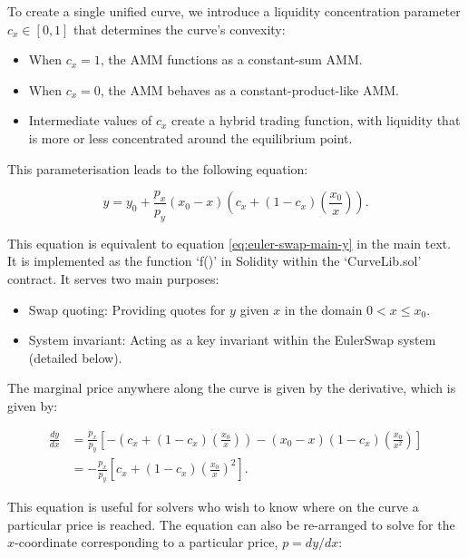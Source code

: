 \documentclass{article}
\begin{document}
To create a single unified curve, we introduce a liquidity concentration parameter \( c_x \in [0, 1] \) that determines the curve's convexity:

\begin{itemize}
    \item When \( c_x = 1 \), the AMM functions as a constant-sum AMM.
    \item When \( c_x = 0 \), the AMM behaves as a constant-product-like AMM.
    \item Intermediate values of \( c_x \) create a hybrid trading function, with liquidity that is more or less concentrated around the equilibrium point.
\end{itemize}

This parameterisation leads to the following equation:

\begin{equation}
    \label{eq:EulerSwap-1}
    y = y_0 + \frac{p_x}{p_y} (x_0 - x) \left( c_x + (1 - c_x) \left(\frac{x_0}{x}\right) \right).
\end{equation}

This equation is equivalent to equation \eqref{eq:euler-swap-main-y} in the main text. It is implemented as the function `f()' in Solidity within the `CurveLib.sol' contract. It serves two main purposes:

\begin{itemize}
    \item Swap quoting: Providing quotes for \(y\) given \(x\) in the domain \(0 < x \leq x_0\).
    \item System invariant: Acting as a key invariant within the EulerSwap system (detailed below).
\end{itemize}

The marginal price anywhere along the curve is given by the derivative, which is given by:

\begin{align}
    \frac{dy}{dx}
    &=
    \frac{p_x}{p_y} \left[ -\left( c_x + (1 - c_x) \left( \frac{x_0}{x} \right) \right) - (x_0 - x) (1 - c_x) \left( \frac{x_0}{x^2} \right) \right] \\ \nonumber
    &=
    -\frac{p_x}{p_y} \left[ c_x + (1 - c_x) \left( \frac{x_0}{x} \right)^2 \right].
\end{align}

This equation is useful for solvers who wish to know where on the curve a particular price is reached. The equation can also be re-arranged to solve for the $x$-coordinate corresponding to a particular price, $p = dy / dx$:
\end{document}
